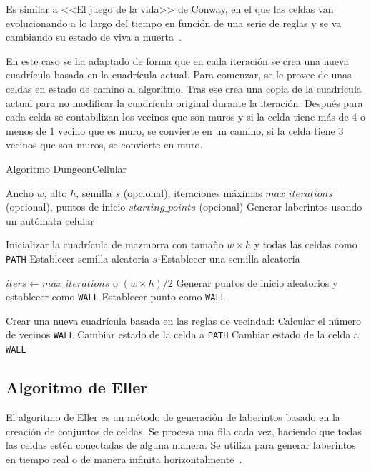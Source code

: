 Es similar a <<El juego de la vida>> de Conway, en el que las celdas van evolucionando a lo largo del tiempo en función de una serie de reglas y se va cambiando su estado de viva a muerta~\cite{wikipediaMazeGeneration}.


En este caso se ha adaptado de forma que en cada iteración se crea una nueva cuadrícula basada en la cuadrícula actual. Para comenzar, se le provee de unas celdas en estado de camino al algoritmo. Tras ese crea una copia de la cuadrícula actual para no modificar la cuadrícula original durante la iteración. Después para cada celda se contabilizan los vecinos que son muros y si la celda tiene más de 4 o menos de 1 vecino que es muro, se convierte en un camino, si la celda tiene 3 vecinos que son muros, se convierte en muro.


\begin{algorithm}
\caption{Algoritmo DungeonCellular}
\begin{algorithmic}[1]
\Require Ancho $w$, alto $h$, semilla $s$ (opcional), iteraciones máximas $max\_iterations$ (opcional), puntos de inicio $starting\_points$ (opcional)
\Ensure Generar laberintos usando un autómata celular

\State Inicializar la cuadrícula de mazmorra con tamaño $w \times h$ y todas las celdas como \texttt{PATH}
    \State Establecer semilla aleatoria $s$
\Else
    \State Establecer una semilla aleatoria
\EndIf

\State $iters \gets max\_iterations$ o $(w \times h) / 2$
    \State Generar puntos de inicio aleatorios y establecer como \texttt{WALL}
\Else
        \State Establecer punto como \texttt{WALL}
    \EndFor
\EndIf

    \State Crear una nueva cuadrícula basada en las reglas de vecindad:
        \State Calcular el número de vecinos \texttt{WALL}
            \State Cambiar estado de la celda a \texttt{PATH}
            \State Cambiar estado de la celda a \texttt{WALL}
        \EndIf
    \EndFor
\EndFor

\end{algorithmic}
\end{algorithm}



\subsection{Algoritmo de Eller}
El algoritmo de Eller es un método de generación de laberintos basado en la creación de conjuntos de celdas. Se procesa una fila cada vez, haciendo que todas las celdas estén conectadas de alguna manera. Se utiliza para generar laberintos en tiempo real o de manera infinita horizontalmente~\cite{MazeGenAnalysis}.

